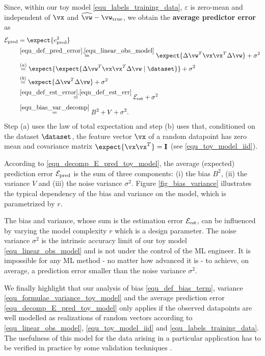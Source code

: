 \documentclass[12pt]{report}
\begin{document}
Since, within our toy model \eqref{equ_labels_training_data}, $\varepsilon$ is zero-mean and independent of 
$\vx$ and $\widehat{\vw} - \vw_{\rm true}$, we obtain the {\bf average predictor error} as 
\begin{align} 
\label{equ_decomp_E_pred_toy_model}
\mathcal{E}_{\rm pred} & = \expect \{ e_{\rm pred}^{2} \} \nonumber \\
& \stackrel{\eqref{equ_def_pred_error},\eqref{equ_linear_obs_model}}{=} \expect \{ \Delta \vw^{T} \vx \vx^{T} \Delta \vw \} + \sigma^{2}   \nonumber \\
& \stackrel{(a)}{=} \expect \{ \expect \{ \Delta \vw^{T} \vx \vx^{T} \Delta \vw \mid \dataset \} \} + \sigma^{2}  \nonumber \\
& \stackrel{(b)}{=} \expect \{ \Delta \vw^{T} \Delta \vw \}  + \sigma^{2}  \nonumber \\
& \stackrel{\eqref{equ_def_est_error},\eqref{equ_def_est_err}}{=} \mathcal{E}_{\rm est} + \sigma^{2} \nonumber \\
& \stackrel{\eqref{equ_bias_var_decomp}}{=} B^{2} + V + \sigma^{2}. 
\end{align} 
Step (a) uses the law of total expectation \cite{BillingsleyProbMeasure} and 
step (b) uses that, conditioned on the dataset $\dataset$, the feature vector 
$\vx$ of a random datapoint has zero mean and covariance matrix $\expect \{ \vx \vx^{T}\}=\mathbf{I}$ (see \eqref{equ_toy_model_iid}). 

According to \eqref{equ_decomp_E_pred_toy_model}, the average (expected) 
prediction error $\mathcal{E}_{\rm pred}$ is the sum of three components: (i) 
the bias $B^{2}$, (ii) the variance $V$ and (iii) the noise variance $\sigma^{2}$. 
Figure \ref{fig_bias_variance} illustrates the typical dependency of the bias and 
variance on the model, which is parametrized by $r$. 

The bias and variance, whose sum is the estimation error $\mathcal{E}_{\rm est}$, 
can be influenced by varying the model complexity $r$ which is a design parameter. 
The noise variance $\sigma^{2}$ is the intrinsic accuracy limit of our toy model \eqref{equ_linear_obs_model} 
and is not under the control of the ML engineer. It is impossible for 
any ML method - no matter how advanced it is - to achieve, 
on average, a prediction error smaller than the noise variance $\sigma^{2}$. 

We finally highlight that our analysis of bias \eqref{equ_def_bias_term}, 
variance \eqref{equ_formulae_variance_toy_model} and the average prediction 
error \eqref{equ_decomp_E_pred_toy_model} only applies if the observed 
datapoints are well modelled as realizations of random vectors according 
to \eqref{equ_linear_obs_model}, \eqref{equ_toy_model_iid} and \eqref{equ_labels_training_data}. 
The usefulness of this model for the data arising in a particular application 
has to be verified in practice by some validation techniques \cite{Young93,Vasicek76}. 
\end{document}
